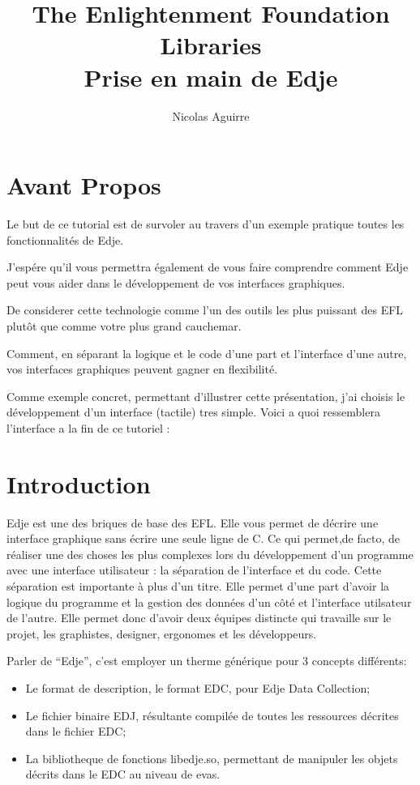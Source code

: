 \documentclass[a4paper]{efr}
\title{The Enlightenment Foundation Libraries\\
  \normalsize{Prise en main de Edje}}
\author{Nicolas Aguirre}
\begin{document}
\maketitle
\tableofcontents

\section{Avant Propos}
Le but de ce tutorial est de survoler au travers d'un exemple pratique toutes
les fonctionnalités de Edje.

J'espére qu'il vous permettra également de vous faire comprendre comment Edje
peut vous aider dans le développement de vos interfaces graphiques.

De considerer cette technologie comme l'un des outils les plus puissant des
EFL plutôt que comme votre plus grand cauchemar.

Comment, en séparant la logique et le code d'une part et l'interface d'une
autre, vos interfaces graphiques peuvent gagner en flexibilité.

Comme exemple concret, permettant d'illustrer cette présentation, j'ai choisis
le développement d'un interface (tactile) tres simple.
Voici a quoi ressemblera l'interface a la fin de ce tutoriel :

\section{Introduction}
Edje est une des briques de base des EFL. Elle vous permet de décrire une
interface graphique sans écrire une seule ligne de C. Ce qui permet,de facto,
de réaliser une des choses les plus complexes lors du développement d'un
programme avec une interface utilisateur : la séparation de l'interface et du
code. Cette séparation est importante à plus d'un titre. Elle permet d'une part
d'avoir la logique du programme et la gestion des données d'un côté et
l'interface utilsateur de l'autre. Elle permet donc d'avoir deux équipes
distincte qui travaille sur le projet, les graphistes, designer, ergonomes et
les développeurs.

Parler de ``Edje'', c'est employer un therme générique pour 3 concepts
différents:
\begin{itemize}
\item Le format de description, le format EDC, pour Edje Data Collection;
\item Le fichier binaire EDJ, résultante compilée de toutes les ressources
décrites dans le fichier EDC;
\item La bibliotheque de fonctions libedje.so, permettant de manipuler les
objets décrits dans le EDC au niveau de evas.
\end{itemize}
\end{document}
